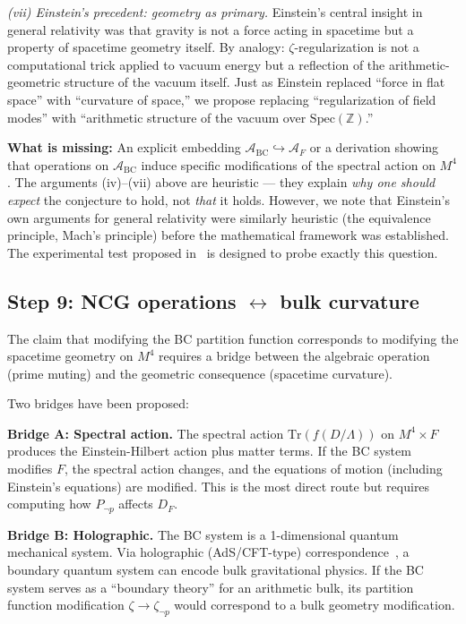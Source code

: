\documentclass[aps,prd,twocolumn,superscriptaddress,nofootinbib]{revtex4-2}
\newcommand{\Spec}{\mathrm{Spec}}
\newcommand{\Tr}{\mathrm{Tr}}
\begin{document}
\textit{(vii) Einstein's precedent: geometry as primary.}
Einstein's central insight in general relativity was that
gravity is not a force acting in spacetime but a property of
spacetime geometry itself. By analogy: $\zeta$-regularization
is not a computational trick applied to vacuum energy but a
reflection of the arithmetic-geometric structure of the vacuum
itself. Just as Einstein replaced ``force in flat space'' with
``curvature of space,'' we propose replacing ``regularization
of field modes'' with ``arithmetic structure of the vacuum
over $\Spec(\mathbb{Z})$.''

\textbf{What is missing:} An explicit embedding
$\mathcal{A}_{\mathrm{BC}} \hookrightarrow \mathcal{A}_F$
or a derivation showing that operations on
$\mathcal{A}_{\mathrm{BC}}$ induce specific modifications of
the spectral action on $M^4$. The arguments (iv)--(vii) above
are heuristic --- they explain \emph{why one should expect}
the conjecture to hold, not \emph{that} it holds.
However, we note that Einstein's own arguments for general
relativity were similarly heuristic (the equivalence principle,
Mach's principle) before the mathematical framework was
established. The experimental test proposed in~\cite{paper_A}
is designed to probe exactly this question.

\subsection{Step 9: NCG operations $\leftrightarrow$ bulk curvature}

The claim that modifying the BC partition function corresponds
to modifying the spacetime geometry on $M^4$ requires a bridge
between the algebraic operation (prime muting) and the geometric
consequence (spacetime curvature).

Two bridges have been proposed:

\textbf{Bridge A: Spectral action.}
The spectral action $\Tr(f(D/\Lambda))$ on $M^4 \times F$
produces the Einstein-Hilbert action plus matter terms.
If the BC system modifies $F$, the spectral action changes,
and the equations of motion (including Einstein's equations)
are modified. This is the most direct route but requires
computing how $P_{\neg p}$ affects $D_F$.

\textbf{Bridge B: Holographic.}
The BC system is a 1-dimensional quantum mechanical system.
Via holographic (AdS/CFT-type) correspondence~\cite{Maldacena1998},
a boundary quantum system can encode bulk gravitational physics.
If the BC system serves as a ``boundary theory'' for an
arithmetic bulk, its partition function modification
$\zeta \to \zeta_{\neg p}$ would correspond to a bulk geometry
modification.
\end{document}
